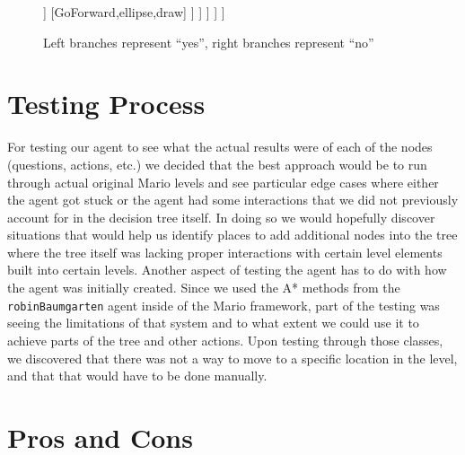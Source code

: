 \documentclass[a4paper, 10pt]{article}
\begin{document}
\begin{figure}[h]
	\centering
	\begin{forest}
		[LevelJustStarted?,draw
			[DoNothing.,ellipse,draw]
			[InAir?,draw
				[GoForward.,ellipse,draw]
				[EnemyVeryClose?,draw
					[GoLeft.,ellipse,draw]
					[EnemyNearby?,draw
						[GoForward.,ellipse,draw]
						[OnLedge?,draw
							[50-50?,draw
								[GoLeft.,ellipse,draw]
								[JumpRight.,ellipse,draw]
							]
							[GoForward,ellipse,draw]
						]
					]
				]
			]
		]
	\end{forest}
	\label{fig:decisionTree}
	\caption{Left branches represent ``yes'', right branches represent ``no''}
\end{figure}

\section{Testing Process}

For testing our agent to see what the actual results were of each of the nodes
(questions, actions, etc.) we decided that the best approach would be to run
through actual original Mario levels and see particular edge cases where either
the agent got stuck or the agent had some interactions that we did not
previously account for in the decision tree itself. In doing so we would
hopefully discover situations that would help us identify places to add
additional nodes into the tree where the tree itself was lacking proper
interactions with certain level elements built into certain levels. Another
aspect of testing the agent has to do with how the agent was initially created.
Since we used the A* methods from the \texttt{robinBaumgarten} agent inside of
the Mario framework, part of the testing was seeing the limitations of that
system and to what extent we could use it to achieve parts of the tree and other
actions. Upon testing through those classes, we discovered that there was not a
way to move to a specific location in the level, and that that would have to be
done manually.

\section{Pros and Cons}
\end{document}
